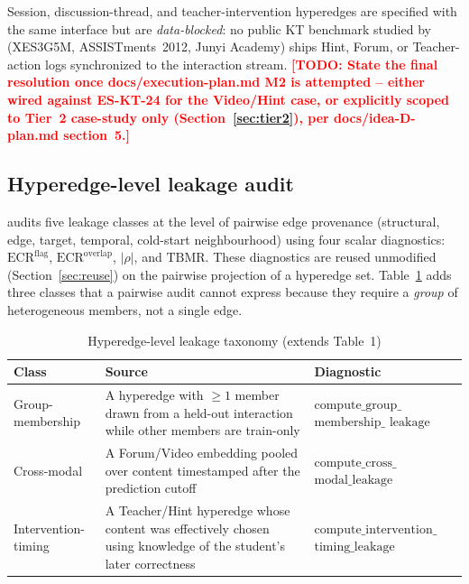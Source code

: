 \documentclass[journal]{IEEEtran}
\newcommand{\todo}[1]{\textcolor{red}{\textbf{[TODO: #1]}}}
\begin{document}
Session, discussion-thread, and teacher-intervention hyperedges are
specified with the same interface but are \emph{data-blocked}: no public KT
benchmark studied by \cite{daominh2026p0} (XES3G5M, ASSISTments~2012, Junyi
Academy) ships Hint, Forum, or Teacher-action logs synchronized to the
interaction stream. \todo{State the final resolution once
docs/execution-plan.md M2 is attempted -- either wired against ES-KT-24
\cite{esk2024} for the Video/Hint case, or explicitly scoped to Tier~2
case-study only (Section~\ref{sec:tier2}), per docs/idea-D-plan.md
section~5.}

\subsection{Hyperedge-level leakage audit}
\label{sec:leakage-ext}

\cite{daominh2026p0} audits five leakage classes at the level of pairwise
edge provenance (structural, edge, target, temporal, cold-start
neighbourhood) using four scalar diagnostics: $\mathrm{ECR}^{\mathrm{flag}}$,
$\mathrm{ECR}^{\mathrm{overlap}}$, $|\rho|$, and $\mathrm{TBMR}$. These
diagnostics are reused unmodified (Section~\ref{sec:reuse}) on the pairwise
projection of a hyperedge set. Table~\ref{tab:leakage-taxonomy} adds three
classes that a pairwise audit cannot express because they require a
\emph{group} of heterogeneous members, not a single edge.

\begin{table}[!t]
\caption{Hyperedge-level leakage taxonomy (extends \cite{daominh2026p0}
Table~1)}
\label{tab:leakage-taxonomy}
\centering
\begin{tabular}{@{}p{2.1cm}p{2.9cm}p{2.4cm}@{}}
\toprule
Class & Source & Diagnostic \\
\midrule
Group-membership & A hyperedge with $\ge 1$ member drawn from a held-out
interaction while other members are train-only & $\mathrm{compute\_group\_}$ $\mathrm{membership\_}$ $\mathrm{leakage}$ \\
Cross-modal & A Forum/Video embedding pooled over content timestamped after
the prediction cutoff & $\mathrm{compute\_cross\_}$ $\mathrm{modal\_leakage}$ \\
Intervention-timing & A Teacher/Hint hyperedge whose content was effectively
chosen using knowledge of the student's later correctness & $\mathrm{compute\_intervention\_}$ $\mathrm{timing\_leakage}$ \\
\bottomrule
\end{tabular}
\end{table}
\end{document}
